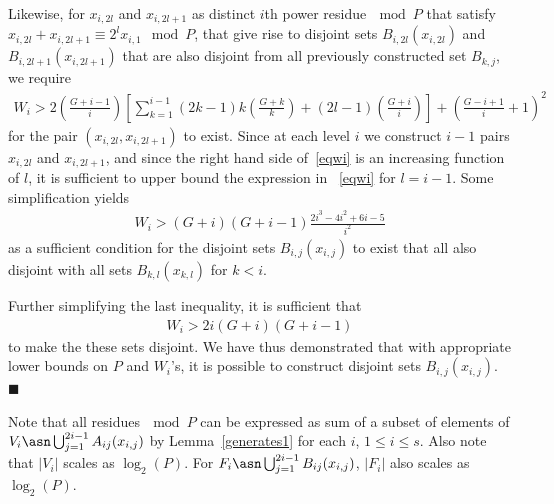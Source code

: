 Likewise, for  $x_{i,2l}$ and $x_{i,2l+1}$ as distinct $i$th power
residue$~\mod P$ that satisfy $x_{i,2l}+ x_{i,2l+1} \equiv
2^lx_{i,1} \mod P$, that give rise to disjoint sets
$B_{i,2l}(x_{i,2l})$ and $B_{i,2l+1}(x_{i,2l+1})$ that are also
disjoint from all previously constructed set $B_{k,j}$, we require
\begin{equation}\label{eqwi}\begin{array}{lll} W_i>
2(\frac{G+i-1}{i}) \left[\sum_{k=1}^{i-1}
(2k-1)k(\frac{G+k}{k})+(2l-1)\left(
\frac{G+i}{i}\right)\right]+\left( \frac{G-i+1}{i}+1\right)^2
\end{array}\end{equation}
for the pair $(x_{i,2l},x_{i,2l+1})$ to exist. Since at each level
$i$ we construct $i-1$ pairs $x_{i,2l}$ and $x_{i,2l+1}$, and
since the right hand side of~\eqref{eqwi} is an increasing
function of $l$, it is sufficient to upper bound the expression in
~\eqref{eqwi} for $l=i-1$. Some simplification yields
\begin{equation}\begin{array}{lll} W_i>
(G+i)(G+i-1)\frac{2i^3-4i^2+6i-5}{i^2}
\end{array}\end{equation}
as a sufficient condition for the disjoint sets $B_{i,j}(x_{i,j})$
to exist that all also disjoint with all sets $B_{k,l}(x_{k,l})$
for $k<i$.

Further simplifying the last inequality, it is sufficient that
\begin{equation}\begin{array}{lll} W_i>
2i(G+i)(G+i-1)
\end{array}\end{equation}
to make the these sets disjoint. We have thus demonstrated that
with appropriate lower bounds on $P$ and $W_i$'s, it is possible
to construct disjoint sets $B_{i,j}(x_{i,j})$.
 \hfill$\blacksquare$

Note that all residues$~\mod P$ can be expressed as sum of a
subset of elements of $V_i \asn
\bigcup_{j=1}^{2i-1}A_{ij}(x_{i,j})$ by Lemma~\ref{generates1} for
each $i$, $1\leq i \leq s$. Also note that $|V_i|$ scales as
$\log_2(P)$. For $F_i \asn \bigcup_{j=1}^{2i-1}B_{ij}(x_{i,j})$,
 $|F_i|$ also scales as
$\log_2(P)$.

